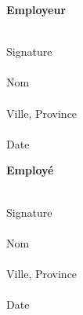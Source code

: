 \documentclass{article}
\begin{document}
    \begin{minipage}[t]{0.45\textwidth}
    	{\bfseries Employeur} \\ \smallskip
    	
    	\underline{\hspace{\textwidth}} \\
    	Signature \\[0.5cm]
    	\underline{\hspace{\textwidth}} \\
    	Nom \\[0.5cm]
    	\underline{\hspace{\textwidth}} \\
    	Ville, Province \\[0.5cm]
    	\underline{\hspace{\textwidth}} \\
    	Date \\
    \end{minipage}%
    \hfill%
    \begin{minipage}[t]{0.45\textwidth}
    	{\bfseries Employé} \\ \smallskip
    	
    	\underline{\hspace{\textwidth}} \\
    	Signature \\[0.5cm]
    	\underline{\hspace{\textwidth}} \\
    	Nom \\[0.5cm]
    	\underline{\hspace{\textwidth}} \\
    	Ville, Province \\[0.5cm]
    	\underline{\hspace{\textwidth}} \\
    	Date \\
    \end{minipage}
    
    \vfill
    
    {\centering%
    \par}
    
    \vfill
    
    
    

    
    
        
\end{document}

